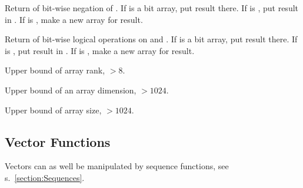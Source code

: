 \begin{LIST}{1cm}
  Return  of bit-wise negation of . If
   is a bit array, put result there. If  is \T, put
  result in . If  is \NIL, make a new array for
  result. 

  Return  of bit-wise logical operations on
   and  . If  is a bit
  array, put result there. If  is \T, put result in
  . If  is \NIL, make a new array for
  result. 

  Upper bound of array rank, $> 8$.

  Upper bound of an array dimension, $> 1024$.

  Upper bound of array size, $> 1024$.

\end{LIST}


\subsection{Vector Functions} 

Vectors can as well be manipulated by sequence functions, see
s.\ \ref{section:Sequences}. 

